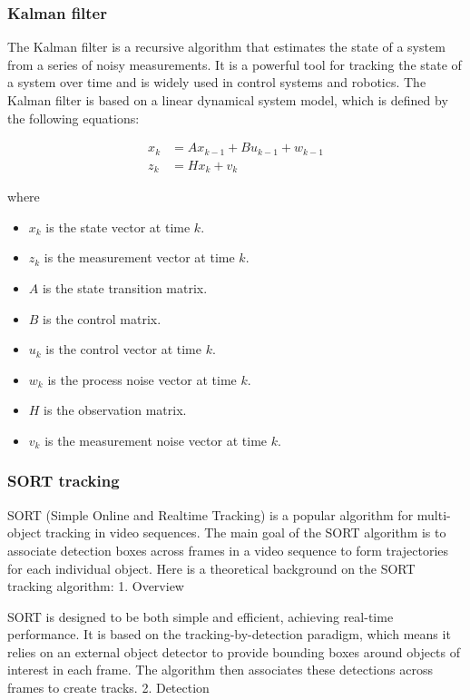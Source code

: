 \subsubsection{Kalman filter} \label{subsubsec:kalman_filter}
The Kalman filter is a recursive algorithm that estimates the state of a system from a series of noisy measurements. It is a powerful tool for tracking the state of a system over time and is widely used in control systems and robotics. The Kalman filter is based on a linear dynamical system model, which is defined by the following equations:

\begin{equation}
    \begin{aligned}
        x_k & = Ax_{k - 1} + Bu_{k - 1} + w_{k - 1} \\
        z_k & = Hx_k + v_k
    \end{aligned}
    \label{eq:kalman_filter}
\end{equation}

where

\begin{itemize}
    \item $x_k$ is the state vector at time $k$.
    \item $z_k$ is the measurement vector at time $k$.
    \item $A$ is the state transition matrix.
    \item $B$ is the control matrix.
    \item $u_k$ is the control vector at time $k$.
    \item $w_k$ is the process noise vector at time $k$.
    \item $H$ is the observation matrix.
    \item $v_k$ is the measurement noise vector at time $k$.
\end{itemize}


\subsubsection{SORT tracking} \label{subsubsec:sort_tracking}
SORT (Simple Online and Realtime Tracking) is a popular algorithm for multi-object tracking in video sequences. The main goal of the SORT algorithm is to associate detection boxes across frames in a video sequence to form trajectories for each individual object. Here is a theoretical background on the SORT tracking algorithm:
1. Overview

SORT is designed to be both simple and efficient, achieving real-time performance. It is based on the tracking-by-detection paradigm, which means it relies on an external object detector to provide bounding boxes around objects of interest in each frame. The algorithm then associates these detections across frames to create tracks.
2. Detection


